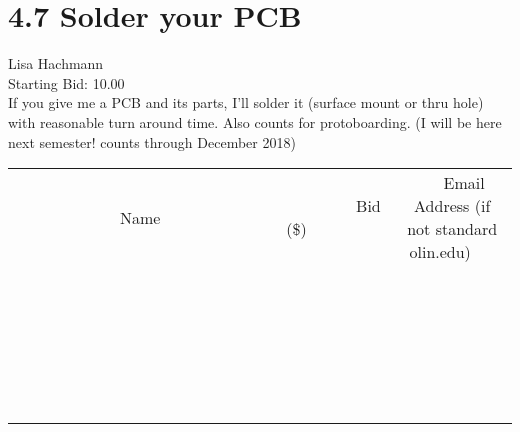 \documentclass[11pt]{article}
\begin{document}
					\section*{4.7 Solder your PCB}
					Lisa Hachmann \\
					Starting Bid: 10.00 \\
					If you give me a PCB and its parts, I'll solder it (surface mount or thru hole) with reasonable turn around time. Also counts for protoboarding. (I will be here next semester! counts through December 2018) \\
					[6ex]
					\begin{tabular}{c c c}
						~~~~~~~~~~~~~Name~~~~~~~~~~~~~ & ~~~~~~~~~Bid (\$)~~~~~~~~~ & ~~~Email Address (if not standard olin.edu)~~~ \\
				
 & & \\
\hline
 & & \\
\hline
 & & \\
\hline
 & & \\
\hline
 & & \\
\hline
 & & \\
\hline
 & & \\
\hline
 & & \\
\hline
 & & \\
\hline
 & & \\
\hline
 & & \\
\hline
 & & \\
\hline
 & & \\
\hline
 & & \\
\hline
 & & \\
\hline
 & & \\
\hline
 & & \\
\hline
 & & \\
\hline
 & & \\
\hline
 & & \\
\hline
 & & \\
\hline
 & & \\
\hline
 & & \\
\hline
 & & \\
\hline
 & & \\
\hline
 & & \\
\hline
					\end{tabular}
					\clearpage
				
\end{document}
